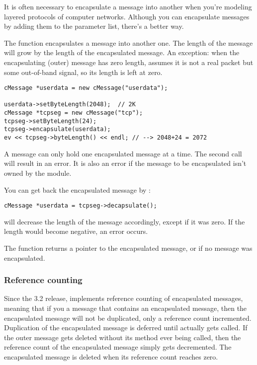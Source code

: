 It is often necessary to encapsulate a
message into another when you're modeling
layered protocols of computer networks. Although you can encapsulate
messages by adding them to the parameter list, there's a better way.


The  function encapsulates a message
into another one. The length of the message will grow by the length of
the encapsulated message. An exception: when the encapsulating (outer)
message has zero length, {\opp} assumes it is not a real packet but
some out-of-band signal, so its length is left at zero.

\begin{verbatim}
cMessage *userdata = new cMessage("userdata");

userdata->setByteLength(2048);  // 2K
cMessage *tcpseg = new cMessage("tcp");
tcpseg->setByteLength(24);
tcpseg->encapsulate(userdata);
ev << tcpseg->byteLength() << endl; // --> 2048+24 = 2072
\end{verbatim}

A message can only hold one encapsulated message at a time. The
second  call will result in an error. It is also
an error if the message to be encapsulated isn't owned by the
module.

You can get back the encapsulated message by :

\begin{verbatim}
cMessage *userdata = tcpseg->decapsulate();
\end{verbatim}

 will decrease the length of the message accordingly,
except if it was zero. If the length would become negative, an
error occurs.

The  function returns a pointer to the encapsulated
message, or  if no message was encapsulated.

\subsubsection{Reference counting{\new}}

Since the 3.2 release, {\opp} implements reference counting of
encapsulated messages, meaning that if you  a message
that contains an encapsulated message, then the encapsulated message will
not be duplicated, only a reference count incremented. Duplication of
the encapsulated message is deferred until 
actually gets called. If the outer message gets deleted without its
 method ever being called, then the reference
count of the encapsulated message simply gets decremented. The
encapsulated message is deleted when its reference count reaches
zero.

